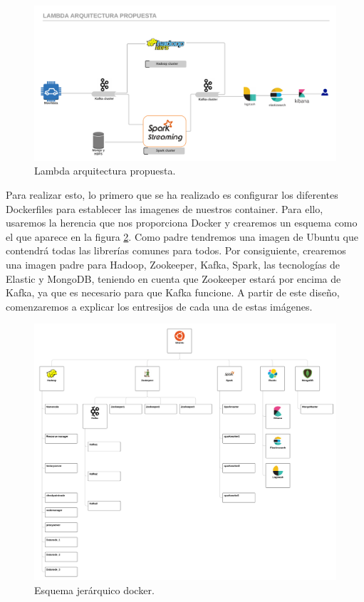 \begin{figure}[htp]
\centering
\includegraphics[scale=0.26]{Imagenes/arqProp1.png}
\caption{Lambda arquitectura propuesta.}
\label{lmdarq1}
\end{figure}

Para realizar esto, lo primero que se ha realizado es configurar los diferentes Dockerfiles para establecer las imagenes de nuestros container. Para ello, usaremos la herencia que nos proporciona Docker y crearemos un esquema como el que aparece en la figura \ref{lmdarq2}. Como padre tendremos una imagen de Ubuntu que contendrá todas las librerías comunes para todos. Por consiguiente, crearemos una imagen padre para Hadoop, Zookeeper, Kafka, Spark, las tecnologías de Elastic y MongoDB, teniendo en cuenta que Zookeeper estará por encima de Kafka, ya que es necesario para que Kafka funcione. A partir de este diseño, comenzaremos a explicar los entresijos de cada una de estas imágenes.

\begin{figure}[htp]
\centering
\includegraphics[scale=0.20]{Imagenes/arqProp2.png}
\caption{Esquema jerárquico docker.}
\label{lmdarq2}
\end{figure}

